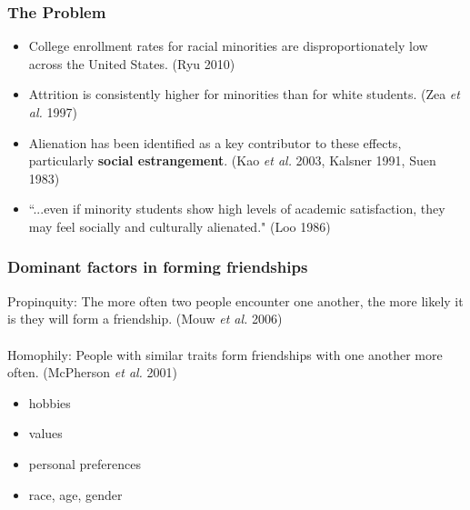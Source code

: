 \documentclass{beamer}
\begin{document}

\begin{frame}
\frametitle{The Problem}
\begin{itemize}
\item College enrollment rates for racial minorities are disproportionately
low across the United States. (Ryu 2010)
\item Attrition is consistently higher for minorities than for white students.
(Zea \textit{et al.} 1997)
\item Alienation has been identified as a key contributor to these effects,
particularly \textbf{social estrangement}. (Kao \textit{et al.} 2003, Kalsner
1991, Suen 1983)
\item ``...even if minority students show high levels of academic
satisfaction, they may feel socially and culturally alienated." (Loo 1986)
\end{itemize}

\end{frame}


\begin{frame}
\frametitle{Dominant factors in forming friendships}
Propinquity: The more often two people encounter one another, the more likely
it is they will form a friendship. (Mouw \textit{et al.} 2006)\\

~~\\

Homophily: People with similar traits form friendships with one another more
often. (McPherson \textit{et al.} 2001)
\begin{itemize}
\item hobbies
\item values
\item personal preferences
\item race, age, gender
\end{itemize}

\end{frame}

\end{document}
